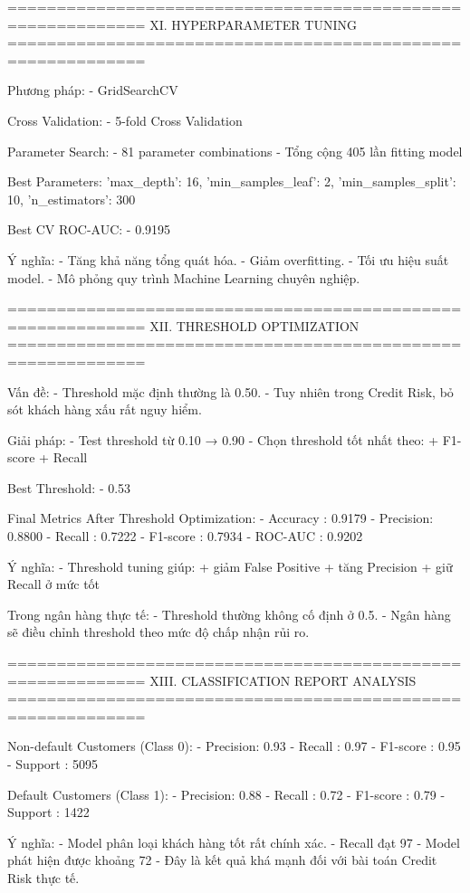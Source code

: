 ============================================================
XI. HYPERPARAMETER TUNING
============================================================

Phương pháp:
- GridSearchCV

Cross Validation:
- 5-fold Cross Validation

Parameter Search:
- 81 parameter combinations
- Tổng cộng 405 lần fitting model

Best Parameters:
{
    'max_depth': 16,
    'min_samples_leaf': 2,
    'min_samples_split': 10,
    'n_estimators': 300
}

Best CV ROC-AUC:
- 0.9195

Ý nghĩa:
- Tăng khả năng tổng quát hóa.
- Giảm overfitting.
- Tối ưu hiệu suất model.
- Mô phỏng quy trình Machine Learning chuyên nghiệp.

============================================================
XII. THRESHOLD OPTIMIZATION
============================================================

Vấn đề:
- Threshold mặc định thường là 0.50.
- Tuy nhiên trong Credit Risk, bỏ sót khách hàng xấu rất nguy hiểm.

Giải pháp:
- Test threshold từ 0.10 → 0.90
- Chọn threshold tốt nhất theo:
  + F1-score
  + Recall

Best Threshold:
- 0.53

Final Metrics After Threshold Optimization:
- Accuracy : 0.9179
- Precision: 0.8800
- Recall   : 0.7222
- F1-score : 0.7934
- ROC-AUC  : 0.9202

Ý nghĩa:
- Threshold tuning giúp:
  + giảm False Positive
  + tăng Precision
  + giữ Recall ở mức tốt

Trong ngân hàng thực tế:
- Threshold thường không cố định ở 0.5.
- Ngân hàng sẽ điều chỉnh threshold theo mức độ chấp nhận rủi ro.

============================================================
XIII. CLASSIFICATION REPORT ANALYSIS
============================================================

Non-default Customers (Class 0):
- Precision: 0.93
- Recall   : 0.97
- F1-score : 0.95
- Support  : 5095

Default Customers (Class 1):
- Precision: 0.88
- Recall   : 0.72
- F1-score : 0.79
- Support  : 1422

Ý nghĩa:
- Model phân loại khách hàng tốt rất chính xác.
- Recall đạt 97%
- Model phát hiện được khoảng 72%
- Đây là kết quả khá mạnh đối với bài toán Credit Risk thực tế.

